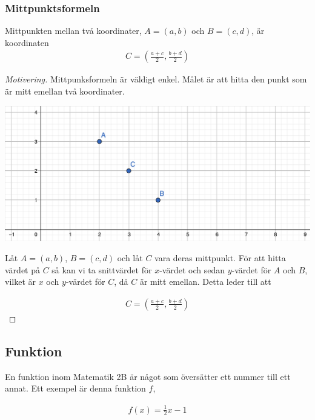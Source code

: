 \newpage
\subsubsection{Mittpunktsformeln}

\begin{theorem}[Mittpunktsformeln]
	Mittpunkten mellan två koordinater, $A=(a,b)$ och $B=(c,d)$, är koordinaten
	\begin{align}
		C = \left(\frac{a+c}{2}, \frac{b+d}{2}\right)
	\end{align}
\end{theorem}

\begin{proof}[Motivering]
Mittpunksformeln är väldigt enkel. Målet är att hitta den punkt som är mitt emellan två koordinater.

\includegraphics[width=\textwidth]{img/4.png}

Låt $A=(a,b)$, $B=(c,d)$ och låt $C$ vara deras mittpunkt. För att hitta värdet på $C$ så kan vi ta snittvärdet för $x$-värdet och sedan $y$-värdet för $A$ och $B$, vilket är $x$ och $y$-värdet för $C$, då $C$ är mitt emellan. Detta leder till att

\begin{align}
	C = \left(\frac{a+c}{2}, \frac{b+d}{2}\right)
\end{align}
\end{proof}

\newpage
\subsection{Funktion}

En funktion inom Matematik 2B är något som översätter ett nummer till ett annat. Ett exempel är denna funktion $f$,

\begin{align}
	f(x) = \frac{1}{2}x-1
\end{align}

